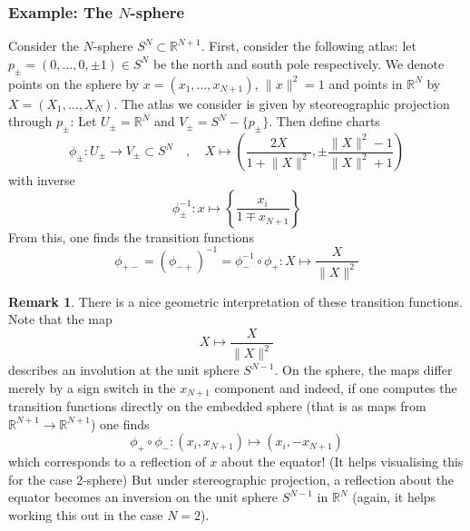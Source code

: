 \documentclass[a4paper,11pt]{article}
\theoremstyle{definition}
\newtheorem{remark}{Remark}
\newcommand{\RR}{\mathbb{R}}
\begin{document}
\subsubsection{Example: The \texorpdfstring{$N$-sphere}{N-sphere}}\label{subsec:cmplxfy_sphere}
Consider the $N$-sphere $S^{N} \subset \RR^{N+1}$.
First, consider the following atlas: let $p_{\pm} = (0, \dots,0, \pm 1) \in S^{N}$ be the north and south pole respectively.
We denote points on the sphere by $x = (x_1, \dots, x_{N+1})$, $\lVert x \rVert^2 = 1$ and points in $\RR^N$ by $X = (X_1, \dots, X_N)$.
The atlas we consider is given by steoreographic projection through $p_{\pm}$:
Let $U_{\pm} = \RR^N$ and $V_{\pm} = S^N - \{ p_{\pm} \}$. 
Then define charts
\begin{equation}
  \phi_{\pm} \colon U_{\pm} \to V_{\pm} \subset S^N \quad , \quad X \mapsto \left( \frac{2 X}{1 + \lVert X \rVert^2}, \pm \frac{\lVert X \rVert^2 - 1}{\lVert X \rVert^2 + 1} \right)
\end{equation}
with inverse
\begin{equation}
  \phi_{\pm}^{-1} \colon x \mapsto \left\{\frac{x_i}{1 \mp x_{N+1}}\right\}
\end{equation}
From this, one finds the transition functions
\begin{equation}
  \phi_{+-} = (\phi_{-+})^{-1} = \phi_{-}^{-1}\circ \phi_{+} \colon X \mapsto \frac{X}{\lVert X \rVert^2}
\end{equation}
\begin{remark}
  There is a nice geometric interpretation of these transition functions.
  Note that the map 
  \begin{equation}
    X \mapsto \frac{X}{\lVert X \rVert^2}
  \end{equation}
  describes an involution at the unit sphere $S^{N-1}$.
  On the sphere, the maps differ merely by a sign switch in the $x_{N+1}$ component and indeed, if one computes the transition functions directly on the embedded sphere (that is as maps from $\RR^{N+1} \to \RR^{N+1}$) one finds
  \begin{equation}
    \phi_{+} \circ \phi_{-} \colon (x_i, x_{N+1}) \mapsto (x_i, - x_{N+1})
  \end{equation}
  which corresponds to a reflection of $x$ about the equator! (It helps visualising this for the case 2-sphere)
  But under stereographic projection, a reflection about the equator becomes an inversion on the unit sphere $S^{N-1}$ in $\RR^N$ (again, it helps working this out in the case $N=2$).
\end{remark}
\end{document}
